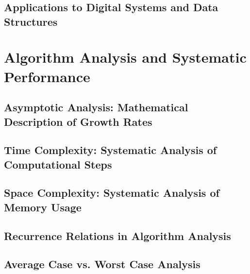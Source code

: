 \documentclass[12pt, oneside, openany]{book}
\let\oldchapter\chapter
\renewcommand{\chapter}{
	\cleardoublepage
	\thispagestyle{chapter}
	\oldchapter
}
\begin{document}
\section{Applications to Digital Systems and Data Structures}


\chapter{Algorithm Analysis and Systematic Performance}

\section{Asymptotic Analysis: Mathematical Description of Growth Rates}

\section{Time Complexity: Systematic Analysis of Computational Steps}

\section{Space Complexity: Systematic Analysis of Memory Usage}

\section{Recurrence Relations in Algorithm Analysis}

\section{Average Case vs. Worst Case Analysis}
\end{document}
